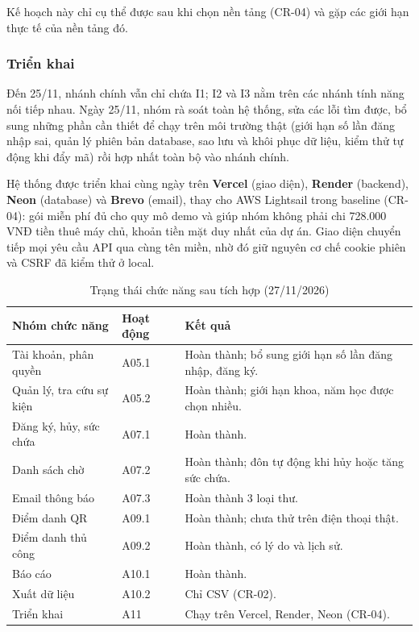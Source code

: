 Kế hoạch này chỉ cụ thể được sau khi chọn nền tảng (CR-04) và gặp các giới hạn thực tế của nền tảng đó.

\subsubsection{Triển khai}

Đến 25/11, nhánh chính vẫn chỉ chứa I1; I2 và I3 nằm trên các nhánh tính năng nối tiếp nhau. Ngày 25/11, nhóm rà soát toàn hệ thống, sửa các lỗi tìm được, bổ sung những phần cần thiết để chạy trên môi trường thật (giới hạn số lần đăng nhập sai, quản lý phiên bản database, sao lưu và khôi phục dữ liệu, kiểm thử tự động khi đẩy mã) rồi hợp nhất toàn bộ vào nhánh chính.

Hệ thống được triển khai cùng ngày trên \textbf{Vercel} (giao diện), \textbf{Render} (backend), \textbf{Neon} (database) và \textbf{Brevo} (email), thay cho AWS Lightsail trong baseline (CR-04): gói miễn phí đủ cho quy mô demo và giúp nhóm không phải chi 728.000 VNĐ tiền thuê máy chủ, khoản tiền mặt duy nhất của dự án. Giao diện chuyển tiếp mọi yêu cầu API qua cùng tên miền, nhờ đó giữ nguyên cơ chế cookie phiên và CSRF đã kiểm thử ở local.

\begin{table}[H]
\centering\small
\caption{Trạng thái chức năng sau tích hợp (27/11/2026)}\label{tab:t3-scope}
\begin{tabularx}{\linewidth}{@{}p{.22\linewidth}p{.11\linewidth}X@{}}
\toprule
\textbf{Nhóm chức năng} & \textbf{Hoạt động} & \textbf{Kết quả}\\\midrule
Tài khoản, phân quyền & A05.1 & Hoàn thành; bổ sung giới hạn số lần đăng nhập, đăng ký.\\
Quản lý, tra cứu sự kiện & A05.2 & Hoàn thành; giới hạn khoa, năm học được chọn nhiều.\\
Đăng ký, hủy, sức chứa & A07.1 & Hoàn thành.\\
Danh sách chờ & A07.2 & Hoàn thành; đôn tự động khi hủy hoặc tăng sức chứa.\\
Email thông báo & A07.3 & Hoàn thành 3 loại thư.\\
Điểm danh QR & A09.1 & Hoàn thành; chưa thử trên điện thoại thật.\\
Điểm danh thủ công & A09.2 & Hoàn thành, có lý do và lịch sử.\\
Báo cáo & A10.1 & Hoàn thành.\\
Xuất dữ liệu & A10.2 & Chỉ CSV (CR-02).\\
Triển khai & A11 & Chạy trên Vercel, Render, Neon (CR-04).\\
\bottomrule
\end{tabularx}
\end{table}

